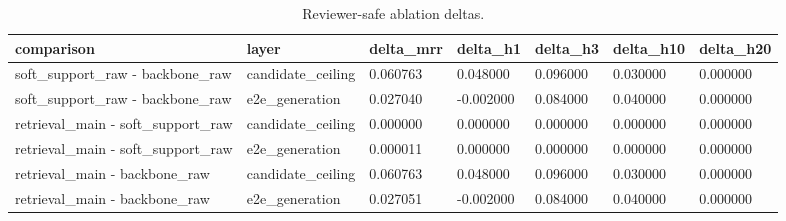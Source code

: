 \begin{table}[t]
\centering
\small
\begin{tabular}{lllllll}
\hline
comparison & layer & delta\_mrr & delta\_h1 & delta\_h3 & delta\_h10 & delta\_h20 \\
\hline
soft\_support\_raw - backbone\_raw & candidate\_ceiling & 0.060763 & 0.048000 & 0.096000 & 0.030000 & 0.000000 \\
soft\_support\_raw - backbone\_raw & e2e\_generation & 0.027040 & -0.002000 & 0.084000 & 0.040000 & 0.000000 \\
retrieval\_main - soft\_support\_raw & candidate\_ceiling & 0.000000 & 0.000000 & 0.000000 & 0.000000 & 0.000000 \\
retrieval\_main - soft\_support\_raw & e2e\_generation & 0.000011 & 0.000000 & 0.000000 & 0.000000 & 0.000000 \\
retrieval\_main - backbone\_raw & candidate\_ceiling & 0.060763 & 0.048000 & 0.096000 & 0.030000 & 0.000000 \\
retrieval\_main - backbone\_raw & e2e\_generation & 0.027051 & -0.002000 & 0.084000 & 0.040000 & 0.000000 \\
\hline
\end{tabular}
\caption{Reviewer-safe ablation deltas.}
\label{tab:e2e-ablation}
\end{table}
